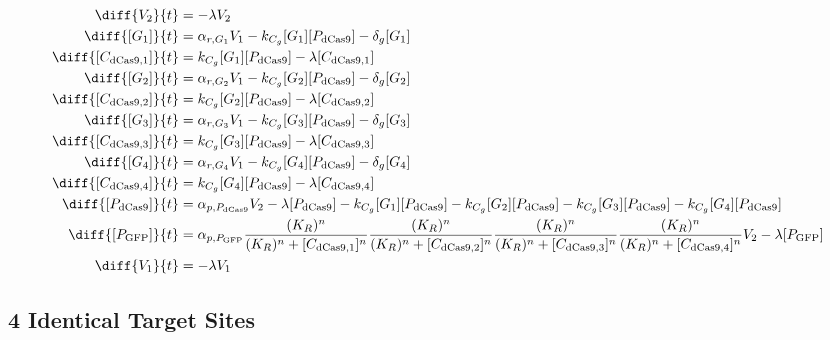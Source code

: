 \begin{align}
\diff{\constructGen{2}}{t} & = - \dilutionRate{}\constructGen{2}\\
\diff{\conc{\gRna{1}}}{t} & =  \txRate{\gRna{1}}\constructGen{1} - \gRnaBind{}\conc{\gRna{1}}\conc{\proSp{\cas{}}} - \rnaDegradeRate{}\conc{\gRna{1}}\\
\diff{\conc{\cplx{\cas}{1}}}{t} & =  \gRnaBind{}\conc{\gRna{1}}\conc{\proSp{\cas{}}} - \dilutionRate{}\conc{\cplx{\cas}{1}}\\
\diff{\conc{\gRna{2}}}{t} & =  \txRate{\gRna{2}}\constructGen{1} - \gRnaBind{}\conc{\gRna{2}}\conc{\proSp{\cas{}}} - \rnaDegradeRate{}\conc{\gRna{2}}\\
\diff{\conc{\cplx{\cas}{2}}}{t} & =  \gRnaBind{}\conc{\gRna{2}}\conc{\proSp{\cas{}}} - \dilutionRate{}\conc{\cplx{\cas}{2}}\\
\diff{\conc{\gRna{3}}}{t} & =  \txRate{\gRna{3}}\constructGen{1} - \gRnaBind{}\conc{\gRna{3}}\conc{\proSp{\cas{}}} - \rnaDegradeRate{}\conc{\gRna{3}}\\
\diff{\conc{\cplx{\cas}{3}}}{t} & =  \gRnaBind{}\conc{\gRna{3}}\conc{\proSp{\cas{}}} - \dilutionRate{}\conc{\cplx{\cas}{3}}\\
\diff{\conc{\gRna{4}}}{t} & =  \txRate{\gRna{4}}\constructGen{1} - \gRnaBind{}\conc{\gRna{4}}\conc{\proSp{\cas{}}} - \rnaDegradeRate{}\conc{\gRna{4}}\\
\diff{\conc{\cplx{\cas}{4}}}{t} & =  \gRnaBind{}\conc{\gRna{4}}\conc{\proSp{\cas{}}} - \dilutionRate{}\conc{\cplx{\cas}{4}}\\
\diff{\conc{\proSp{\cas{}}}}{t} & =  \txtlRate{\proSp{\cas{}}}\constructGen{2} - \dilutionRate{}\conc{\proSp{\cas{}}} - \gRnaBind{}\conc{\gRna{1}}\conc{\proSp{\cas{}}} - \gRnaBind{}\conc{\gRna{2}}\conc{\proSp{\cas{}}} - \gRnaBind{}\conc{\gRna{3}}\conc{\proSp{\cas{}}} - \gRnaBind{}\conc{\gRna{4}}\conc{\proSp{\cas{}}}\\
\diff{\conc{\proSp{\gfp}}}{t} & =  \txtlRate{\proSp{\gfp}}\frac{(K_R)^n}{(K_R)^n + \conc{\cplx{\cas}{1}}^n}\frac{(K_R)^n}{(K_R)^n + \conc{\cplx{\cas}{2}}^n}\frac{(K_R)^n}{(K_R)^n + \conc{\cplx{\cas}{3}}^n}\frac{(K_R)^n}{(K_R)^n + \conc{\cplx{\cas}{4}}^n}\constructGen{2} - \dilutionRate{}\conc{\proSp{\gfp}}\\
\diff{\constructGen{1}}{t} & = - \dilutionRate{}\constructGen{1}
\end{align}

\subsection{4 Identical Target Sites}
\label{s:Multisite_4_gRNA_Repression}


